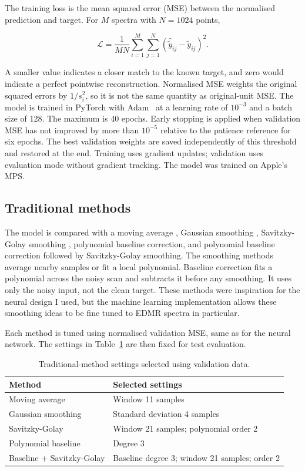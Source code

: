 The training loss is the mean squared error (MSE) between the normalised prediction and target. For $M$ spectra with $N=1024$ points,

\begin{equation}
 \mathcal L=\frac{1}{MN}\sum_{i=1}^{M}\sum_{j=1}^{N}
 \left(\widehat{\widetilde y}_{ij}-\widetilde y_{ij}\right)^2.
 \label{eq:mse}
\end{equation}

A smaller value indicates a closer match to the known target, and zero would indicate a perfect pointwise reconstruction. Normalised MSE weights the original squared errors by $1/s_i^2$, so it is not the same quantity as original-unit MSE. The model is trained in PyTorch with Adam~\cite{kingma2015} at a learning rate of $10^{-3}$ and a batch size of 128. The maximum is 40 epochs. Early stopping is applied when validation MSE has not improved by more than $10^{-5}$ relative to the patience reference for six epochs. The best validation weights are saved independently of this threshold and restored at the end. Training uses gradient updates; validation uses evaluation mode without gradient tracking. The model was trained on Apple's MPS.

\subsection{Traditional methods}

The model is compared with a moving average \cite{scipyuniform}, Gaussian smoothing \cite{scipygaussian}, Savitzky-Golay smoothing \cite{scipysavgol}, polynomial baseline correction, and polynomial baseline correction followed by Savitzky-Golay smoothing. The smoothing methods average nearby samples or fit a local polynomial. Baseline correction fits a polynomial across the noisy scan and subtracts it before any smoothing. It uses only the noisy input, not the clean target. These methods were inspiration for the neural design I used, but the machine learning implementation allows these smoothing ideas to be fine tuned to EDMR spectra in particular.

Each method is tuned using normalised validation MSE, same as for the neural network. The settings in Table~\ref{tab:settings} are then fixed for test evaluation.

\begin{table}[htbp]
\centering
\begin{tabularx}{\textwidth}{@{}lX@{}}
\toprule
Method & Selected settings\\
\midrule
Moving average & Window 11 samples\\
Gaussian smoothing & Standard deviation 4 samples\\
Savitzky-Golay & Window 21 samples; polynomial order 2\\
Polynomial baseline & Degree 3\\
Baseline + Savitzky-Golay & Baseline degree 3; window 21 samples; order 2\\
\bottomrule
\end{tabularx}
\caption{Traditional-method settings selected using validation data.}
\label{tab:settings}
\end{table}

